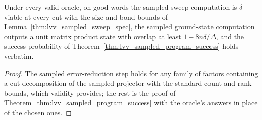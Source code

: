 \begin{lemma}
    \label{thm:lvv_valid_oracle_sampled}
    \leanok
    Under every valid oracle, on good words the sampled sweep computation is
    $\delta$-viable at every cut with the size and bond bounds of
    Lemma~\ref{thm:lvv_sampled_sweep_spec}, the sampled ground-state
    computation outputs a unit matrix product state with overlap at least
    $1-8n\delta/\Delta$, and the success probability of
    Theorem~\ref{thm:lvv_sampled_program_success} holds verbatim.
\end{lemma}
\begin{proof}
    \leanok
    The sampled error-reduction step holds for any family of factors
    containing a cut decomposition of the sampled projector with the standard
    count and rank bounds, which validity provides; the rest is the proof of
    Theorem~\ref{thm:lvv_sampled_program_success} with the oracle's answers in
    place of the chosen ones.
\end{proof}

